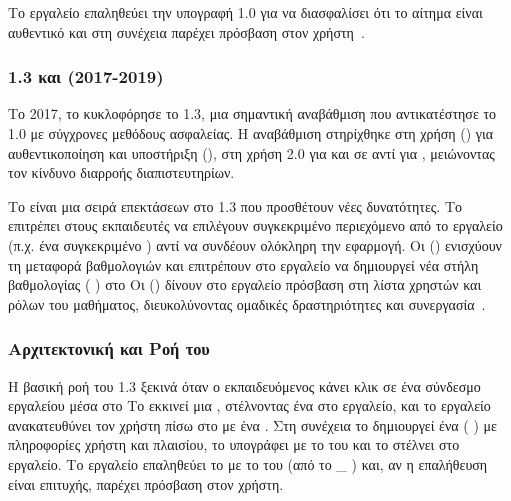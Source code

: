 Το εργαλείο επαληθεύει την υπογραφή  1.0 για να διασφαλίσει ότι το αίτημα είναι αυθεντικό και στη συνέχεια παρέχει πρόσβαση στον χρήστη~\cite{moodle2024lti,blackboard2024lti}.

\subsubsection{ 1.3 και   (2017-2019)}

Το 2017, το  κυκλοφόρησε το  1.3, μια σημαντική αναβάθμιση που αντικατέστησε το  1.0 με σύγχρονες μεθόδους ασφαλείας. Η αναβάθμιση στηρίχθηκε στη χρήση   () για αυθεντικοποίηση και υποστήριξη    (), στη χρήση  2.0 για  και σε    αντί για  , μειώνοντας τον κίνδυνο διαρροής διαπιστευτηρίων.

Το   είναι μια σειρά επεκτάσεων στο  1.3 που προσθέτουν νέες δυνατότητες. Το   επιτρέπει στους εκπαιδευτές να επιλέγουν συγκεκριμένο περιεχόμενο από το εργαλείο (π.χ. ένα συγκεκριμένο ) αντί να συνδέουν ολόκληρη την εφαρμογή. Οι     () ενισχύουν τη μεταφορά βαθμολογιών και επιτρέπουν στο εργαλείο να δημιουργεί νέα στήλη βαθμολογίας ( ) στο  Οι      () δίνουν στο εργαλείο πρόσβαση στη λίστα χρηστών και ρόλων του μαθήματος, διευκολύνοντας ομαδικές δραστηριότητες και συνεργασία~\cite{d2l2024lti,unicon2024lti}.

\subsubsection{Αρχιτεκτονική και Ροή του }

Η βασική ροή του  1.3 ξεκινά όταν ο εκπαιδευόμενος κάνει κλικ σε ένα σύνδεσμο εργαλείου μέσα στο  Το  εκκινεί μια    , στέλνοντας ένα \textit{  } στο εργαλείο, και το εργαλείο ανακατευθύνει τον χρήστη πίσω στο  με ένα \textit{ }. Στη συνέχεια το  δημιουργεί ένα  ( ) με πληροφορίες χρήστη και πλαισίου, το υπογράφει με το   του και το στέλνει στο εργαλείο. Το εργαλείο επαληθεύει το  με το   του  (από το \_ ) και, αν η επαλήθευση είναι επιτυχής, παρέχει πρόσβαση στον χρήστη.

